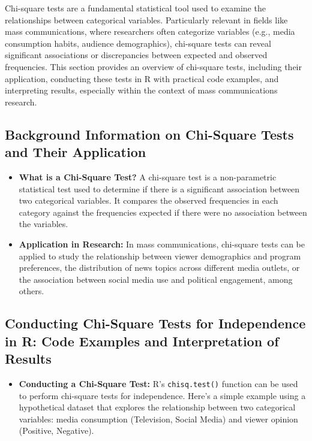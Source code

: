 \documentclass[
]{book}
\providecommand{\tightlist}{%
  \setlength{\itemsep}{0pt}\setlength{\parskip}{0pt}}
\begin{document}
Chi-square tests are a fundamental statistical tool used to examine the relationships between categorical variables. Particularly relevant in fields like mass communications, where researchers often categorize variables (e.g., media consumption habits, audience demographics), chi-square tests can reveal significant associations or discrepancies between expected and observed frequencies. This section provides an overview of chi-square tests, including their application, conducting these tests in R with practical code examples, and interpreting results, especially within the context of mass communications research.

\subsection*{Background Information on Chi-Square Tests and Their Application}\label{background-information-on-chi-square-tests-and-their-application}

\begin{itemize}
\item
  \textbf{What is a Chi-Square Test?} A chi-square test is a non-parametric statistical test used to determine if there is a significant association between two categorical variables. It compares the observed frequencies in each category against the frequencies expected if there were no association between the variables.
\item
  \textbf{Application in Research:} In mass communications, chi-square tests can be applied to study the relationship between viewer demographics and program preferences, the distribution of news topics across different media outlets, or the association between social media use and political engagement, among others.
\end{itemize}

\subsection*{Conducting Chi-Square Tests for Independence in R: Code Examples and Interpretation of Results}\label{conducting-chi-square-tests-for-independence-in-r-code-examples-and-interpretation-of-results}

\begin{itemize}
\tightlist
\item
  \textbf{Conducting a Chi-Square Test:} R's \texttt{chisq.test()} function can be used to perform chi-square tests for independence. Here's a simple example using a hypothetical dataset that explores the relationship between two categorical variables: media consumption (Television, Social Media) and viewer opinion (Positive, Negative).
\end{itemize}
\end{document}
